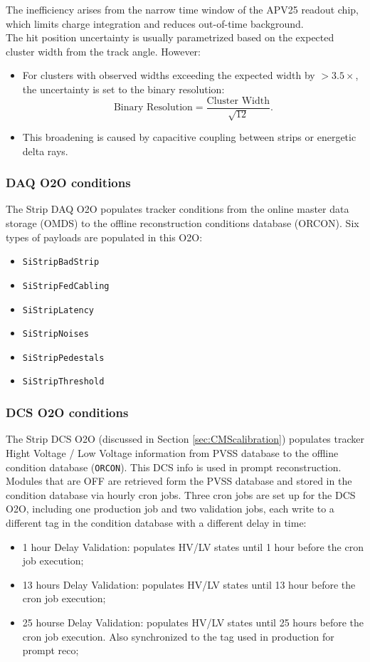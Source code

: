 The inefficiency arises from the narrow time window of the APV25 readout chip, which limits charge integration and reduces out-of-time background.\\

The hit position uncertainty is usually parametrized based on the expected cluster width from the track angle. However:
\begin{itemize}
    \item For clusters with observed widths exceeding the expected width by \(> 3.5\times\), the uncertainty is set to the binary resolution:
    \[
    \text{Binary Resolution} = \frac{\text{Cluster Width}}{\sqrt{12}}.
    \]
    \item This broadening is caused by capacitive coupling between strips or energetic delta rays.
\end{itemize}

\subsubsection{DAQ O2O conditions}
 The Strip DAQ O2O populates tracker conditions from the online master data storage (OMDS) to the offline reconstruction conditions database (ORCON). 
Six types of payloads are populated in this O2O: 
\begin{itemize}
\item \texttt{SiStripBadStrip} 	
\item \texttt{SiStripFedCabling} 	
\item \texttt{SiStripLatency} 	
\item \texttt{SiStripNoises} 	
\item \texttt{SiStripPedestals} 	
\item \texttt{SiStripThreshold}
\end{itemize}

\subsubsection{DCS O2O conditions}
 The Strip DCS O2O (discussed in Section \ref{sec:CMScalibration}) populates tracker Hight Voltage / Low Voltage information from PVSS database to the offline condition database (\texttt{ORCON}). This DCS info is used in prompt reconstruction. Modules that are OFF are retrieved form the PVSS database and stored in the condition database via hourly cron jobs. Three cron jobs are set up for the DCS O2O, including one production job and two validation jobs, each write to a different tag in the condition database with a different delay in time: 
\begin{itemize}
\item 1 hour Delay Validation: populates HV/LV states until 1 hour before the cron job execution;
\item 13 hours Delay Validation: populates HV/LV states until 13 hour before the cron job execution;
\item 25 hourse Delay Validation: populates HV/LV states until 25 hours before the cron job execution. Also synchronized to the tag used in production for prompt reco;
\end{itemize}

